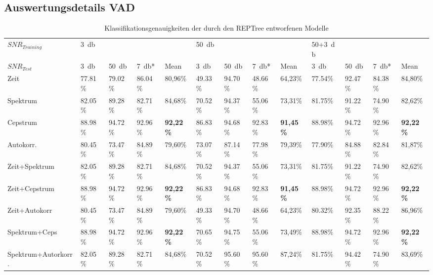 
\begin{appendices}
\begin{landscape}
\chapter{Auswertungsdetails VAD}
\pagestyle{plain}
\begin{table}[h]
\centering
\caption{Klassifikationsgenauigkeiten der durch den REPTree entworfenen Modelle}
\label{tab:reptree_results}
\begin{tabular}{@{}lllllllllllll@{}}
\toprule
$SNR_{Training}$ & \SI{3}{\decibel}     &         &         &                  & \SI{50}{\decibel}    &         &         &                  & 50+\SI{3}{\decibel} &        &         &                  \\ 
$SNR_{Test}$     & \SI{3}{\decibel}     & \SI{50}{\decibel}    & \SI{7}{\decibel}*    & Mean             & \SI{3}{\decibel}     & \SI{50}{\decibel}    & \SI{7}{\decibel}*    & Mean             & \SI{3}{\decibel}     & \SI{50}{\decibel}    & \SI{7}{\decibel}*    & Mean             \\ \midrule
Zeit           & 77.81\% & 79.02\% & 86.04\% & 80,96\%          & 49.33\% & 94.70\% & 48.66\% & 64,23\%          & 77.54\% & 92.47\% & 84.38\% & 84,80\%          \\
Spektrum           & 82.05\% & 89.28\% & 82.71\% & 84,68\%          & 70.52\% & 94.37\% & 55.06\% & 73,31\%          & 81.75\% & 91.22\% & 74.90\% & 82,62\%          \\
Cepstrum           & 88.98\% & 94.72\% & 92.96\% & \textbf{92,22\%} & 86.83\% & 94.68\% & 92.83\% & \textbf{91,45\%} & 88.98\% & 94.72\% & 92.96\% & \textbf{92,22\%} \\
Autokorr.           & 80.45\% & 73.47\% & 84.89\% & 79,60\%          & 73.07\% & 87.14\% & 77.98\% & 79,39\%          & 77.90\% & 84.88\% & 82.84\% & 81,87\%          \\
Zeit+Spektrum      & 82.05\% & 89.28\% & 82.71\% & 84,68\%          & 70.52\% & 94.37\% & 55.06\% & 73,31\%          & 81.75\% & 91.22\% & 74.90\% & 82,62\%          \\
Zeit+Cepstrum      & 88.98\% & 94.72\% & 92.96\% & \textbf{92,22\%} & 86.83\% & 94.68\% & 92.83\% & \textbf{91,45\%} & 88.98\% & 94.72\% & 92.96\% & \textbf{92,22\%} \\
Zeit+Autokorr      & 80.45\% & 73.47\% & 84.89\% & 79,60\%          & 49.33\% & 94.70\% & 48.66\% & 64,23\%          & 80.32\% & 92.35\% & 88.22\% & 86,96\%          \\
Spektrum+Ceps      & 88.98\% & 94.72\% & 92.96\% & \textbf{92,22\%} & 70.65\% & 94.75\% & 55.06\% & 73,49\%          & 88.98\% & 94.72\% & 92.96\% & \textbf{92,22\%} \\
Spektrum+Autorkorr.      & 82.05\% & 89.28\% & 82.71\% & 84,68\%          & 70.52\% & 95.60\% & 95.60\% & 87,24\%          & 81.75\% & 94.42\% & 74.90\% & 83,69\%          \\ \bottomrule
\end{tabular}
\end{table}


\end{landscape}
\end{appendices}
